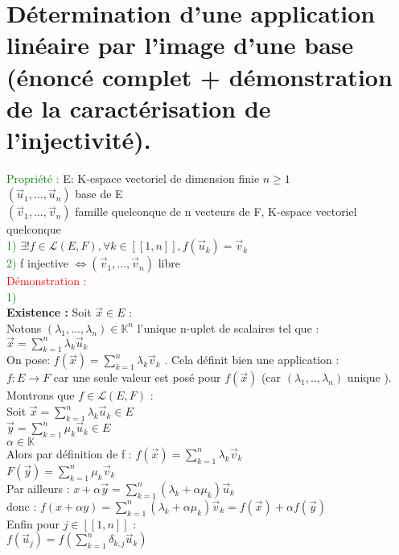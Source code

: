 \documentclass{article}
\begin{document}
\section{Détermination d'une application linéaire par l'image d'une base (énoncé complet + démonstration de la caractérisation de l'injectivité).}
\textcolor{green}{Propriété :}
E: K-espace vectoriel de dimension finie $n \geq 1$ \\
$(\vec u_1,..., \vec u_n)$ base de E \\
$(\vec v_1,..., \vec v_n)$ famille quelconque de n vecteurs de F, K-espace vectoriel quelconque \\
\textcolor{green}{1)} $\exists ! f \in \mathcal L (E,F), \forall k \in [[1,n]], f(\vec u_k)= \vec v_k$ \\
\textcolor{green}{2)} f injective $\Longleftrightarrow (\vec v_1,..., \vec v_n)$ libre \\
\textcolor{red}{Démonstration :} \\
\textcolor{green}{1)} \\
{\bf Existence :} Soit $\vec x \in E$ : \\
Notons $(\lambda_1,...,\lambda_n) \in \mathbb K^n$ l'unique n-uplet de scalaires tel que : \\
$\vec x = \sum_{k=1}^n \lambda_k \vec u_k$ \\
On pose: $f(\vec x)= \sum_{k=1}^n \lambda_k \vec v_k$ . Cela définit bien une application : \\
$f :E \rightarrow F$ car une seule valeur est posé pour $f(\vec x)$ (car $(\lambda_1,.., \lambda_n)$ unique ). \\
Montrons que $f \in \mathcal L (E,F)$ : \\
Soit $\vec x= \sum_{k=1}^n \lambda_k \vec u_k \in E$ \\
$\vec y= \sum_{k=1}^n \mu_k \vec u_k \in E$ \\
$\alpha \in \mathbb K$ \\
Alors par définition de f : $f(\vec x)= \sum_{k=1}^n \lambda_k \vec v_k$ \\
$F(\vec y) = \sum_{k=1}^n \mu_k \vec v_k$ \\
Par ailleurs : $x+ \alpha \vec y= \sum_{k=1}^n (\lambda_k + \alpha \mu_k) \vec u_k$ \\
donc : $f(x+\alpha y) = \sum_{k=1}^n(\lambda_k+\alpha \mu_k) \vec v_k= f(\vec x) + \alpha f(\vec y)$ \\
Enfin pour $j \in [[1,n]]$ : \\
$f(\vec u_j)=f(\sum_{k=1}^n \delta_{k,j} \vec u_k)$ \\
\end{document}
